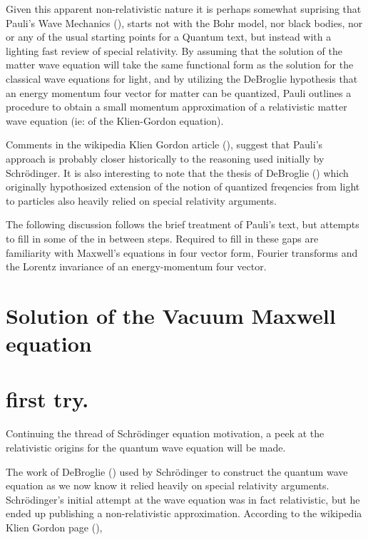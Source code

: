 \documentclass[]{eliblog}
\begin{document}
Given this apparent non-relativistic nature it is perhaps somewhat suprising that Pauli's Wave Mechanics (\cite{pauli2000wm}),
starts not with the Bohr model, nor black bodies, nor or any of the usual starting points for a Quantum text,
but instead with a lighting fast review of special relativity.
By assuming that the solution of the matter wave equation will take the same functional form as the solution for the classical wave equations
for light, and
by utilizing the
DeBroglie hypothesis that an energy momentum four vector for matter can be quantized, Pauli 
outlines a procedure to obtain a small momentum approximation of a relativistic matter wave equation (ie: of the Klien-Gordon equation).

Comments in
the wikipedia Klien Gordon article (\cite{wikiKG}), suggest that Pauli's approach is probably closer historically to
the reasoning used initially
by Schr\"{o}dinger.  It is also interesting to note that the thesis of DeBroglie (\cite{AFkracklauerDeBroglie}) which
originally hypothosized extension of the notion of quantized freqencies from light to particles 
also heavily relied on special relativity arguments.

The following discussion follows the brief treatment of Pauli's text, but attempts to fill in some of the in between steps.
Required to fill in these gaps are familiarity with Maxwell's equations in four vector form,
Fourier transforms and the Lorentz invariance of an energy-momentum four vector.

\section{Solution of the Vacuum Maxwell equation}
%
%

\section{first try.}
Continuing the thread of Schr\"{o}dinger equation motivation, a peek at the relativistic origins for the quantum wave equation will be made.

The work of DeBroglie (\cite{AFkracklauerDeBroglie}) used by Schr\"{o}dinger to construct the quantum wave equation as we now know it relied heavily on special relativity arguments.  
Schr\"{o}dinger's initial attempt at the wave equation was in fact relativistic, but he ended up publishing a non-relativistic 
approximation.
According to the wikipedia Klien Gordon page (\cite{wikiKG}), 
\end{document}

